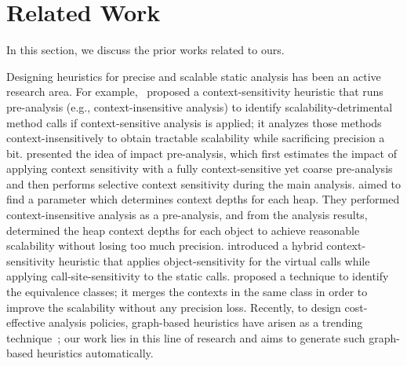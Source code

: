 
\section{Related Work}
In this section, we discuss the prior works related to ours.



Designing heuristics for precise and scalable static analysis has been an active research area.
For example,~\citet{Smaragdakis2014} proposed a context-sensitivity heuristic that runs pre-analysis (e.g., context-insensitive analysis) to identify scalability-detrimental method calls if context-sensitive analysis is applied;
it analyzes those methods context-insensitively to obtain tractable scalability while sacrificing precision a bit.
\citet{Oh2014} presented the idea of impact pre-analysis, which first estimates the impact of applying context sensitivity with a fully context-sensitive yet coarse pre-analysis and then performs selective context sensitivity during the main analysis.
\citet{Hassanshahi2017} aimed to find a parameter which determines context depths for each heap.
They performed context-insensitive analysis as a pre-analysis, and from the analysis results,
determined the heap context depths for each object to achieve reasonable scalability without losing too much precision.
\citet{kastrinis2013hybrid} introduced a hybrid context-sensitivity heuristic that applies object-sensitivity for the virtual
calls while applying call-site-sensitivity to the static calls.
\citet{Xu2008} proposed a technique to identify the equivalence classes;
it merges the contexts in the same class in order to improve the scalability without any precision loss.
Recently, to design cost-effective analysis policies, graph-based heuristics have arisen as a trending technique~\cite{TanLX16,Tan2017,Li2018a,Li2018b,Lu2019};
our work lies in this line of research and aims to generate such graph-based heuristics automatically.


